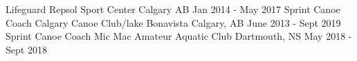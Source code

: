 \begin{cventries}
	\cventry
	{Lifeguard}
	{Repsol Sport Center}
	{Calgary AB}
	{Jan 2014 - May 2017}
	{}
	\cventry
	{Sprint Canoe Coach}
	{Calgary Canoe Club/lake Bonavista}
	{Calgary, AB}
	{June 2013 - Sept 2019}
	{}
	\cventry
	{Sprint Canoe Coach}
	{Mic Mac Amateur Aquatic Club}
	{Dartmouth, NS}
	{May 2018 - Sept 2018}
	{}
\end{cventries}
